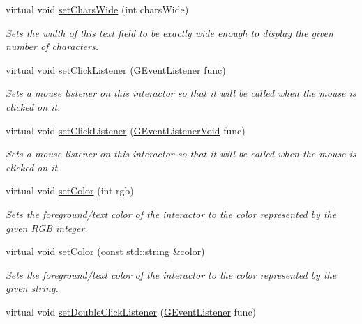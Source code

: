 \begin{DoxyCompactItemize}
virtual void \mbox{\hyperlink{classsgl_1_1GTextField_aef8026e0b00b17dbccfc456e75308f16}{set\+Chars\+Wide}} (int chars\+Wide)
\begin{DoxyCompactList}\small\item\em Sets the width of this text field to be exactly wide enough to display the given number of characters. \end{DoxyCompactList}\item 
virtual void \mbox{\hyperlink{classsgl_1_1GInteractor_abd40af6921242584d0954f173911b190}{set\+Click\+Listener}} (\mbox{\hyperlink{namespacesgl_ae9f3e9eab70035da1a2b114e21357b25}{G\+Event\+Listener}} func)
\begin{DoxyCompactList}\small\item\em Sets a mouse listener on this interactor so that it will be called when the mouse is clicked on it. \end{DoxyCompactList}\item 
virtual void \mbox{\hyperlink{classsgl_1_1GInteractor_a856414c92df90f56f3877475eb3f8fc4}{set\+Click\+Listener}} (\mbox{\hyperlink{namespacesgl_a54427ce97bb1c2804e4fe2b0a62e8b17}{G\+Event\+Listener\+Void}} func)
\begin{DoxyCompactList}\small\item\em Sets a mouse listener on this interactor so that it will be called when the mouse is clicked on it. \end{DoxyCompactList}\item 
virtual void \mbox{\hyperlink{classsgl_1_1GInteractor_ab1f5cc0f5cc6bbbd716a526c61f1081d}{set\+Color}} (int rgb)
\begin{DoxyCompactList}\small\item\em Sets the foreground/text color of the interactor to the color represented by the given R\+GB integer. \end{DoxyCompactList}\item 
virtual void \mbox{\hyperlink{classsgl_1_1GInteractor_a61374df6c11b52cfbb0815decdbaebc6}{set\+Color}} (const std\+::string \&color)
\begin{DoxyCompactList}\small\item\em Sets the foreground/text color of the interactor to the color represented by the given string. \end{DoxyCompactList}\item 
virtual void \mbox{\hyperlink{classsgl_1_1GInteractor_ac29f9a3462458e165fae3a1f046ee77a}{set\+Double\+Click\+Listener}} (\mbox{\hyperlink{namespacesgl_ae9f3e9eab70035da1a2b114e21357b25}{G\+Event\+Listener}} func)

\end{DoxyCompactItemize}
